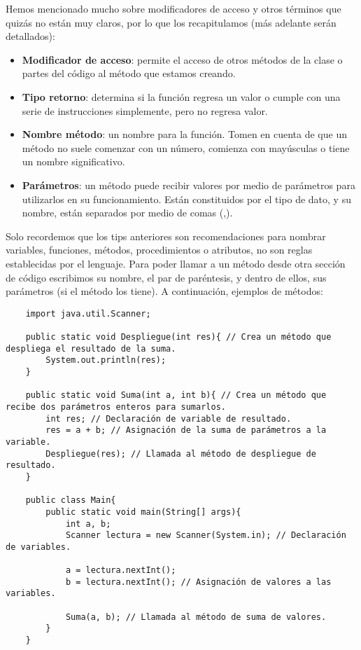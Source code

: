 Hemos mencionado mucho sobre modificadores de acceso y otros términos que quizás no están muy claros, por lo que los recapitulamos (más adelante serán detallados):
\begin{itemize}
    \item \textbf{Modificador de acceso}: permite el acceso de otros métodos de la clase o partes del código al método que estamos creando.
    \item \textbf{Tipo retorno}: determina si la función regresa un valor o cumple con una serie de instrucciones simplemente, pero no regresa valor.
    \item \textbf{Nombre método}: un nombre para la función. Tomen en cuenta de que un método no suele comenzar con un número, comienza con mayúsculas o tiene un nombre significativo.
    \item \textbf{Parámetros}: un método puede recibir valores por medio de parámetros para utilizarlos en su funcionamiento. Están constituidos por el tipo de dato, y su nombre, están separados por medio de comas (,).
\end{itemize}

Solo recordemos que los tips anteriores son recomendaciones para nombrar variables, funciones, métodos, procedimientos o atributos, no son reglas establecidas por el lenguaje. Para poder llamar a un método desde otra sección de código escribimos su nombre, el par de paréntesis, y dentro de ellos, sus parámetros (si el método los tiene). A continuación, ejemplos de métodos:
\begin{lstlisting}
    import java.util.Scanner;
    
    public static void Despliegue(int res){ // Crea un método que despliega el resultado de la suma.
        System.out.println(res);
    }
    
    public static void Suma(int a, int b){ // Crea un método que recibe dos parámetros enteros para sumarlos.
        int res; // Declaración de variable de resultado.
        res = a + b; // Asignación de la suma de parámetros a la variable.
        Despliegue(res); // Llamada al método de despliegue de resultado.
    }
    
    public class Main{
        public static void main(String[] args){
            int a, b;
            Scanner lectura = new Scanner(System.in); // Declaración de variables.
            
            a = lectura.nextInt();
            b = lectura.nextInt(); // Asignación de valores a las variables.
            
            Suma(a, b); // Llamada al método de suma de valores.
        }
    }
\end{lstlisting}


